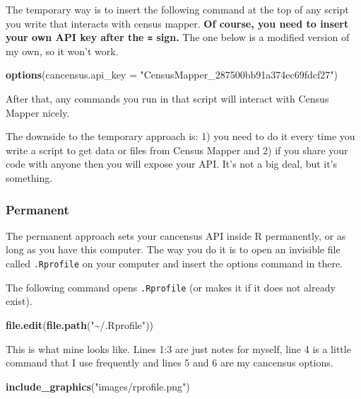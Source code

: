 \documentclass[
]{article}
\newenvironment{Shaded}{\begin{snugshade}}{\end{snugshade}}
\newcommand{\DataTypeTok}[1]{\textcolor[rgb]{0.13,0.29,0.53}{#1}}
\newcommand{\KeywordTok}[1]{\textcolor[rgb]{0.13,0.29,0.53}{\textbf{#1}}}
\newcommand{\NormalTok}[1]{#1}
\newcommand{\StringTok}[1]{\textcolor[rgb]{0.31,0.60,0.02}{#1}}
\begin{document}
The temporary way is to insert the following command at the top of any
script you write that interacts with census mapper. \textbf{Of course,
you need to insert your own API key after the \texttt{=} sign.} The one
below is a modified version of my own, so it won't work.

\begin{Shaded}
\begin{Highlighting}[]
\KeywordTok{options}\NormalTok{(}\DataTypeTok{cancensus.api\_key =} \StringTok{"CensusMapper\_287500bb91a374ec69fdcf27"}\NormalTok{)}
\end{Highlighting}
\end{Shaded}

After that, any commands you run in that script will interact with
Census Mapper nicely.

The downside to the temporary approach is: 1) you need to do it every
time you write a script to get data or files from Census Mapper and 2)
if you share your code with anyone then you will expose your API. It's
not a big deal, but it's something.

\hypertarget{permanent}{%
\subsubsection{Permanent}\label{permanent}}

The permanent approach sets your cancensus API inside R permanently, or
as long as you have this computer. The way you do it is to open an
invisible file called \texttt{.Rprofile} on your computer and insert the
options command in there.

The following command opens \texttt{.Rprofile} (or makes it if it does
not already exist).

\begin{Shaded}
\begin{Highlighting}[]
\KeywordTok{file.edit}\NormalTok{(}\KeywordTok{file.path}\NormalTok{(}\StringTok{"\textasciitilde{}/.Rprofile"}\NormalTok{))}
\end{Highlighting}
\end{Shaded}

This is what mine looks like. Lines 1:3 are just notes for myself, line
4 is a little command that I use frequently and lines 5 and 6 are my
cancensus options.

\begin{Shaded}
\begin{Highlighting}[]
\KeywordTok{include\_graphics}\NormalTok{(}\StringTok{"images/rprofile.png"}\NormalTok{)}
\end{Highlighting}
\end{Shaded}
\end{document}
